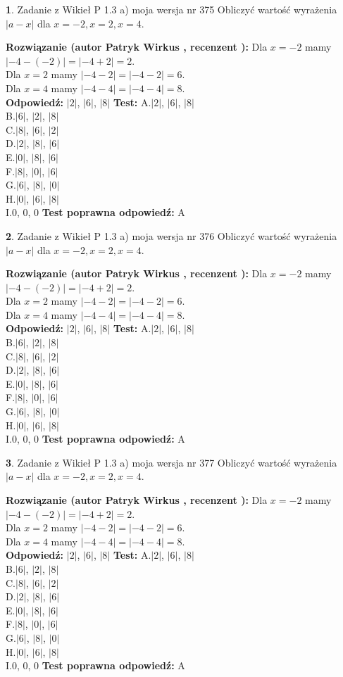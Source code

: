 \documentclass[12pt, a4paper]{article}
\theoremstyle{definition} %
\newtheorem{zad}{}
\newcommand{\zadStart}[1]{\begin{zad}#1\newline}
\newcommand{\zadStop}{\end{zad}}
\newcommand{\rozwStart}[2]{\noindent \textbf{Rozwiązanie (autor #1 , recenzent #2): }\newline}
\newcommand{\rozwStop}{\newline}
\newcommand{\odpStart}{\noindent \textbf{Odpowiedź:}\newline}
\newcommand{\odpStop}{\newline}
\newcommand{\testStart}{\noindent \textbf{Test:}\newline}
\newcommand{\testStop}{\newline}
\newcommand{\kluczStart}{\noindent \textbf{Test poprawna odpowiedź:}\newline}
\newcommand{\kluczStop}{\newline}
\begin{document}
\zadStart{Zadanie z Wikieł P 1.3 a) moja wersja nr 375}
Obliczyć wartość wyrażenia $|a - x|$ dla $x=-2,x=2,x=4$.
\zadStop
\rozwStart{Patryk Wirkus}{}
Dla $x = -2$ mamy $|-4 - (-2)| = |-4 + 2| = 2$.\\
Dla $x = 2$ mamy $|-4 - 2| = |-4 - 2| = 6$.\\
Dla $x = 4$ mamy $|-4 - 4| = |-4 - 4| = 8$.\\
\rozwStop
\odpStart
$|2|$, $|6|$, $|8|$
\odpStop
\testStart
A.$|2|$, $|6|$, $|8|$\\
B.$|6|$, $|2|$, $|8|$\\
C.$|8|$, $|6|$, $|2|$\\
D.$|2|$, $|8|$, $|6|$\\
E.$|0|$, $|8|$, $|6|$\\
F.$|8|$, $|0|$, $|6|$\\
G.$|6|$, $|8|$, $|0|$\\
H.$|0|$, $|6|$, $|8|$\\
I.$0$, $0$, $0$
\testStop
\kluczStart
A
\kluczStop



\zadStart{Zadanie z Wikieł P 1.3 a) moja wersja nr 376}
Obliczyć wartość wyrażenia $|a - x|$ dla $x=-2,x=2,x=4$.
\zadStop
\rozwStart{Patryk Wirkus}{}
Dla $x = -2$ mamy $|-4 - (-2)| = |-4 + 2| = 2$.\\
Dla $x = 2$ mamy $|-4 - 2| = |-4 - 2| = 6$.\\
Dla $x = 4$ mamy $|-4 - 4| = |-4 - 4| = 8$.\\
\rozwStop
\odpStart
$|2|$, $|6|$, $|8|$
\odpStop
\testStart
A.$|2|$, $|6|$, $|8|$\\
B.$|6|$, $|2|$, $|8|$\\
C.$|8|$, $|6|$, $|2|$\\
D.$|2|$, $|8|$, $|6|$\\
E.$|0|$, $|8|$, $|6|$\\
F.$|8|$, $|0|$, $|6|$\\
G.$|6|$, $|8|$, $|0|$\\
H.$|0|$, $|6|$, $|8|$\\
I.$0$, $0$, $0$
\testStop
\kluczStart
A
\kluczStop



\zadStart{Zadanie z Wikieł P 1.3 a) moja wersja nr 377}
Obliczyć wartość wyrażenia $|a - x|$ dla $x=-2,x=2,x=4$.
\zadStop
\rozwStart{Patryk Wirkus}{}
Dla $x = -2$ mamy $|-4 - (-2)| = |-4 + 2| = 2$.\\
Dla $x = 2$ mamy $|-4 - 2| = |-4 - 2| = 6$.\\
Dla $x = 4$ mamy $|-4 - 4| = |-4 - 4| = 8$.\\
\rozwStop
\odpStart
$|2|$, $|6|$, $|8|$
\odpStop
\testStart
A.$|2|$, $|6|$, $|8|$\\
B.$|6|$, $|2|$, $|8|$\\
C.$|8|$, $|6|$, $|2|$\\
D.$|2|$, $|8|$, $|6|$\\
E.$|0|$, $|8|$, $|6|$\\
F.$|8|$, $|0|$, $|6|$\\
G.$|6|$, $|8|$, $|0|$\\
H.$|0|$, $|6|$, $|8|$\\
I.$0$, $0$, $0$
\testStop
\kluczStart
A
\kluczStop
\end{document}
